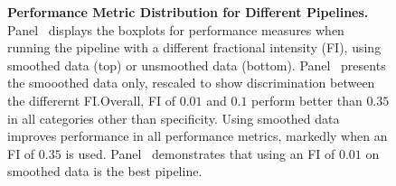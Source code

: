 \documentclass{article}\usepackage[]{graphicx}\usepackage[]{color}
\begin{document}
\begin{figure}
\hfill
\caption{{\bf Performance Metric Distribution for Different Pipelines.} Panel~\protect{} displays the boxplots for performance measures when running the pipeline with a different fractional intensity (FI), using smoothed data (top) or unsmoothed data (bottom).  Panel~\protect{} presents the smooothed data only, rescaled to show discrimination between the differernt FI.Overall, FI of $0.01$ and $0.1$ perform better than $0.35$ in all categories other than specificity.  Using smoothed data improves performance in all performance metrics, markedly when an FI of $0.35$ is used.  Panel~\protect{} demonstrates that using an FI of $0.01$ on smoothed data is the best pipeline.  }
\label{fig:metrics}
\end{figure}
\end{document}
